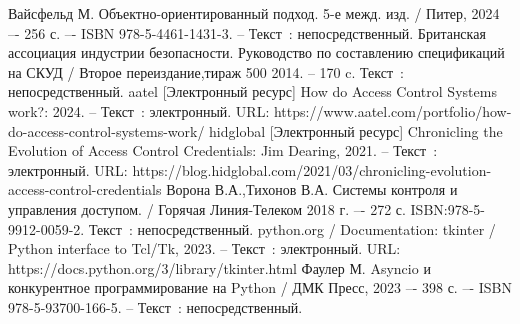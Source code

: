 \begin{thebibliography}{9}
	Вайсфельд М. Объектно-ориентированный подход. 5-е межд. изд. / Питер, 2024 –- 256 с. –- ISBN 978-5-4461-1431-3. – Текст~: непосредственный.    	
	Британская ассоциация индустрии безопасности. Руководство по составлению спецификаций на СКУД / Второе переиздание,тираж 500 2014. -- 170 c. Текст~: непосредственный.
	aatel [Электронный ресурс] How do Access Control Systems work?: 2024. – Текст~: электронный. URL: https://www.aatel.com/portfolio/how-do-access-control-systems-work/	
	hidglobal [Электронный ресурс] Chronicling the Evolution of Access Control Credentials: Jim Dearing, 2021. – Текст~: электронный. URL: https://blog.hidglobal.com/2021/03/chronicling-evolution-access-control-credentials
	Ворона В.А.,Тихонов В.А. Системы контроля и управления доступом. / Горячая Линия-Телеком 2018 г. –- 272 с. ISBN:978-5-9912-0059-2. Текст~: непосредственный.	
	python.org / Documentation: tkinter / Python interface to Tcl/Tk, 2023. – Текст~: электронный. URL: https://docs.python.org/3/library/tkinter.html
	Фаулер М. Asyncio и конкурентное программирование на Python / ДМК Пресс, 2023 –- 398 с. –- ISBN 978-5-93700-166-5. – Текст~: непосредственный.  
	
\end{thebibliography}
